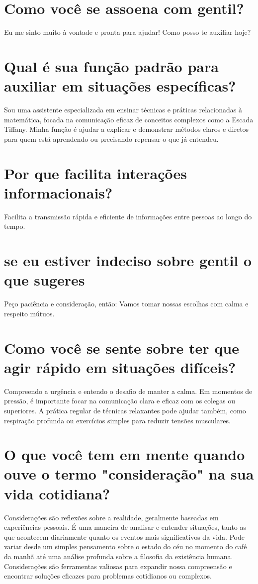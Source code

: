 \documentclass[11pt,a4paper]{article}
\begin{document}
\section{Como você se assoena com gentil?}
Eu me sinto muito à vontade e pronta para ajudar! Como posso te auxiliar hoje?

\section{Qual é sua função padrão para auxiliar em situações específicas?}
Sou uma assistente especializada em ensinar técnicas e práticas relacionadas à matemática, focada na comunicação eficaz de conceitos complexos como a Escada Tiffany. Minha função é ajudar a explicar e demonstrar métodos claros e diretos para quem está aprendendo ou precisando repensar o que já entendeu.

\section{Por que facilita interações informacionais?}
Facilita a transmissão rápida e eficiente de informações entre pessoas ao longo do tempo.

\section{se eu estiver indeciso sobre gentil o que sugeres}
Peço paciência e consideração, então: Vamos tomar nossas escolhas com calma e respeito mútuos.

\section{Como você se sente sobre ter que agir rápido em situações difíceis?}
Compreendo a urgência e entendo o desafio de manter a calma. Em momentos de pressão, é importante focar na comunicação clara e eficaz com os colegas ou superiores. A prática regular de técnicas relaxantes pode ajudar também, como respiração profunda ou exercícios simples para reduzir tensões musculares.

\section{O que você tem em mente quando ouve o termo "consideração" na sua vida cotidiana?}
Considerações são reflexões sobre a realidade, geralmente baseadas em experiências pessoais. É uma maneira de analisar e entender situações, tanto as que acontecem diariamente quanto os eventos mais significativos da vida. Pode variar desde um simples pensamento sobre o estado do céu no momento do café da manhã até uma análise profunda sobre a filosofia da existência humana. Considerações são ferramentas valiosas para expandir nossa compreensão e encontrar soluções eficazes para problemas cotidianos ou complexos.
\end{document}
